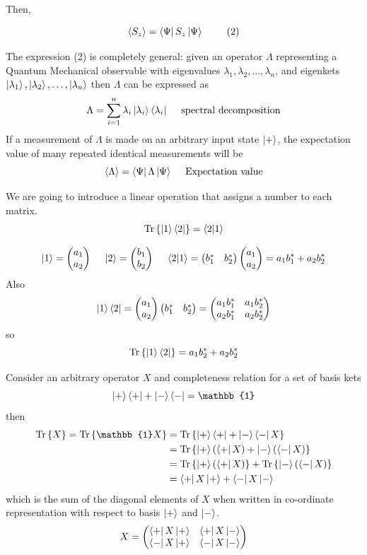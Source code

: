 \documentclass[english, 11pt]{article}
\begin{document}
      Then,

      \[ \E{S_z} = \bra{\Psi}S_z\kpsi \ \ \ \ \ \ \ (2) \]

      The expression (2) is completely general: given an operator $\Lambda$ representing a Quantum Mechanical observable with eigenvalues $\lambda_1, \lambda_2, \ldots, \lambda_n$, and eigenkets $\left|\lambda_1\right\rangle, \left|\lambda_2\right\rangle, \ldots, \left|\lambda_n\right\rangle$ then $\Lambda$ can be expressed as
      \[ \Lambda = \sum_{i=1}^n \lambda_i \left|\lambda_i\right\rangle\left\langle\lambda_i\right| \ \ \ \ \mbox{spectral decomposition} \]
      If a measurement of $\Lambda$ is made on an arbitrary input state $\left|+\right\rangle$, the expectation value of many repeated identical measurements will be
      \[ \E{\Lambda} = \bra{\Psi}\Lambda\kpsi \ \ \ \ \mbox{Expectation value} \]

      \begin{defn}[trace]\label{trace}
        We are going to introduce a linear operation that assigns a number to each matrix.
        \[ \trace{\ket{1}\bra{2}} = \braket{2}{1} \]
      \end{defn}

      \begin{exmp}
          \[ \ket{1} = \mtx{a_1 \\ a_2} \ \ \ \ \ket{2} = \mtx{b_1 \\ b_2} \ \ \ \ \braket{2}{1} = \mtx{b_1^* & b_2^*}\mtx{a_1 \\ a_2} = a_1b_1^* + a_2b_2^* \]
          Also
          \[ \left|1\right\rangle\left\langle2\right| = \left(\begin{matrix}a_1 \\ a_2\end{matrix}\right)\left(\begin{matrix}b_1^* & b_2^*\end{matrix}\right) = \left(\begin{matrix}a_1b_1^* & a_1b_2^* \\ a_2b_1^* & a_2b_2^*\end{matrix}\right) \]
          so
          \[ \mbox{Tr}\left\{ \left|1\right\rangle\left\langle2\right| \right\} = a_1b_2^* + a_2b_2^* \]
      \end{exmp}

      Consider an arbitrary operator $X$ and completeness relation for a set of basis kets
      \[ \ket{+}\bra{+} + \ket{-}\bra{-} = \mathbb{1} \]
      then
      \begin{align*}
        \trace{X} = \tr{\mathbb{1}X} & = \tr{\ket{+}\bra{+} + \ket{-}\bra{-}X} \\
                                     & = \tr{\ket{+}\left( \bra{+}X \right) + \ket{-}\left( \bra{-}X \right)} \\
                                     & = \tr{\ket{+}\left( \bra{+}X \right)} + \tr{\ket{-}\left( \bra{-}X \right)} \\
                                     & = \bra{+}X\ket{+} + \bra{-}X\ket{-}
      \end{align*}
      which is the sum of the diagonal elements of $X$ when written in co-ordinate representation with respect to basis $\left|+\right\rangle$ and $\left|-\right\rangle$.
      \[ X = \left(\begin{matrix}\left\langle+\right| X\left|+\right\rangle & \left\langle+\right| X\left|-\right\rangle \\ \left\langle-\right| X\left|+\right\rangle & \left\langle-\right| X\left|-\right\rangle\end{matrix}\right) \]
\end{document}

